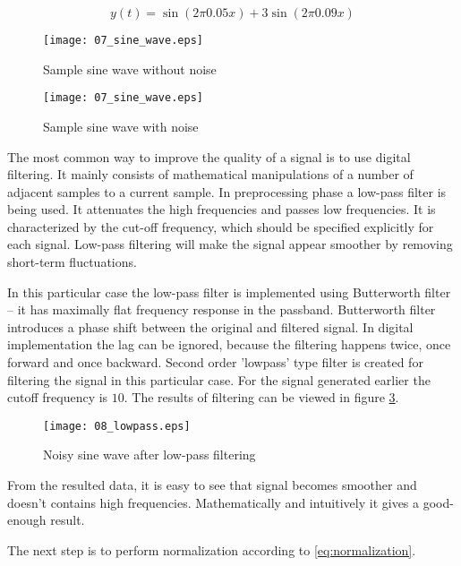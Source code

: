 \begin{equation} \label{eq:sample_sine}
 y(t) = \sin(2\pi 0.05 x) + 3\sin(2\pi 0.09 x)
\end{equation}


\begin{figure}[!ht]
\centering
  \texttt{[image: 07\_sine\_wave.eps]}
\caption{Sample sine wave without noise}
\label{fig:sines1}
\end{figure}

\begin{figure}[!ht]
\centering
  \texttt{[image: 07\_sine\_wave.eps]}
\caption{Sample sine wave with noise}
\label{fig:sines2}
\end{figure}

The most common way to improve the quality of a signal is to use digital filtering. It mainly consists of mathematical manipulations of a number of adjacent samples to a current sample. In preprocessing phase a low-pass filter is being used. It attenuates the high frequencies and passes low frequencies. It is characterized by the cut-off frequency, which should be specified explicitly for each signal. Low-pass filtering will make the signal appear smoother by removing short-term fluctuations. 

In this particular case the low-pass filter is implemented using Butterworth filter -- it has maximally flat frequency response in the passband. Butterworth filter introduces a phase shift between the original and filtered signal. In digital implementation the lag can be ignored, because the filtering happens twice, once forward and once backward. Second order 'lowpass' type filter is created for filtering the signal in this particular case. For the signal generated earlier the cutoff frequency is $10$. The results of filtering can be viewed in figure \ref{fig:lowpass}.

\begin{figure}[!ht]
\centering
  \texttt{[image: 08\_lowpass.eps]}
\caption{Noisy sine wave after low-pass filtering}
\label{fig:lowpass}
\end{figure}

From the resulted data, it is easy to see that signal becomes smoother and doesn't contains high frequencies. Mathematically and intuitively it gives a good-enough result. 

The next step is to perform normalization according to \eqref{eq:normalization}.

